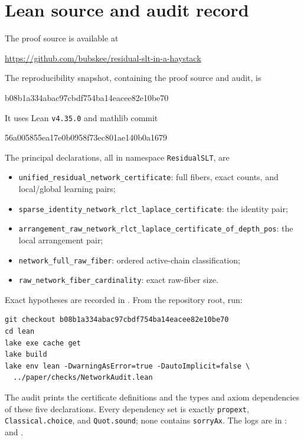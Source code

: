 \documentclass[11pt,letterpaper]{amsart}
\newcommand{\leanname}[1]{{\urlstyle{tt}\nolinkurl{#1}}}
\theoremstyle{scplain}
\begin{document}
\section{Lean source and audit record}\label{app:repro}
The proof source is available at
\begin{center}\small\url{https://github.com/bubskee/residual-slt-in-a-haystack}\end{center}
The reproducibility snapshot, containing the proof source and audit, is
\begin{center}\small\ttfamily b08b1a334abac97cbdf754ba14eacee82e10be70\end{center}
It uses Lean \texttt{v4.35.0} and mathlib commit
\begin{center}\small\ttfamily 56a005855ea17e0b0958f73ec801ae140b0a1679\end{center}
The principal declarations, all in namespace \texttt{ResidualSLT}, are
\begin{itemize}\setlength{\itemsep}{0pt}
\item \leanname{unified_residual_network_certificate}: full fibers, exact counts, and local/global learning pairs;
\item \leanname{sparse_identity_network_rlct_laplace_certificate}: the identity pair;
\item \leanname{arrangement_raw_network_rlct_laplace_certificate_of_depth_pos}: the local arrangement pair;
\item \leanname{network_full_raw_fiber}: ordered active-chain classification;
\item \leanname{raw_network_fiber_cardinality}: exact raw-fiber size.
\end{itemize}

\noindent\begin{minipage}{\linewidth}
Exact hypotheses are recorded in . From the repository root, run:
\begingroup\small
\begin{verbatim}
git checkout b08b1a334abac97cbdf754ba14eacee82e10be70
cd lean
lake exe cache get
lake build
lake env lean -DwarningAsError=true -DautoImplicit=false \
  ../paper/checks/NetworkAudit.lean
\end{verbatim}
\endgroup
\end{minipage}

The audit prints the certificate definitions and the types and axiom dependencies of these five declarations. Every dependency set is exactly \texttt{propext}, \texttt{Classical.choice}, and \texttt{Quot.sound}; none contains \texttt{sorryAx}. The logs are in : \mbox{} and \mbox{}.
\end{document}
